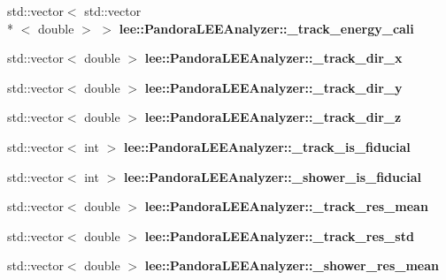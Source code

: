 \begin{DoxyCompactItemize}
\item 
\hypertarget{group__lee_gabc42592a0839c13f76a4eb677328cfb3}{std\-::vector$<$ std\-::vector\\*
$<$ double $>$ $>$ {\bfseries lee\-::\-Pandora\-L\-E\-E\-Analyzer\-::\-\_\-track\-\_\-energy\-\_\-cali}}\label{group__lee_gabc42592a0839c13f76a4eb677328cfb3}

\item 
\hypertarget{group__lee_ga8a992d49401db441d8c6e890ce1c1bce}{std\-::vector$<$ double $>$ {\bfseries lee\-::\-Pandora\-L\-E\-E\-Analyzer\-::\-\_\-track\-\_\-dir\-\_\-x}}\label{group__lee_ga8a992d49401db441d8c6e890ce1c1bce}

\item 
\hypertarget{group__lee_ga28bd177e5a7cacbd35fb5aec0865cd57}{std\-::vector$<$ double $>$ {\bfseries lee\-::\-Pandora\-L\-E\-E\-Analyzer\-::\-\_\-track\-\_\-dir\-\_\-y}}\label{group__lee_ga28bd177e5a7cacbd35fb5aec0865cd57}

\item 
\hypertarget{group__lee_ga2349ca54f697314697ff75504bbf042e}{std\-::vector$<$ double $>$ {\bfseries lee\-::\-Pandora\-L\-E\-E\-Analyzer\-::\-\_\-track\-\_\-dir\-\_\-z}}\label{group__lee_ga2349ca54f697314697ff75504bbf042e}

\item 
\hypertarget{group__lee_ga0c6ecffb2e944bd9842a1bbc1f6a05f1}{std\-::vector$<$ int $>$ {\bfseries lee\-::\-Pandora\-L\-E\-E\-Analyzer\-::\-\_\-track\-\_\-is\-\_\-fiducial}}\label{group__lee_ga0c6ecffb2e944bd9842a1bbc1f6a05f1}

\item 
\hypertarget{group__lee_ga97495f8c6c496aefe56f07f06a5a55ce}{std\-::vector$<$ int $>$ {\bfseries lee\-::\-Pandora\-L\-E\-E\-Analyzer\-::\-\_\-shower\-\_\-is\-\_\-fiducial}}\label{group__lee_ga97495f8c6c496aefe56f07f06a5a55ce}

\item 
\hypertarget{group__lee_gac8415acd9fe624379b1af65fe523a613}{std\-::vector$<$ double $>$ {\bfseries lee\-::\-Pandora\-L\-E\-E\-Analyzer\-::\-\_\-track\-\_\-res\-\_\-mean}}\label{group__lee_gac8415acd9fe624379b1af65fe523a613}

\item 
\hypertarget{group__lee_gacb00c39c2b71bd7fac4a3c7c6733d514}{std\-::vector$<$ double $>$ {\bfseries lee\-::\-Pandora\-L\-E\-E\-Analyzer\-::\-\_\-track\-\_\-res\-\_\-std}}\label{group__lee_gacb00c39c2b71bd7fac4a3c7c6733d514}

\item 
\hypertarget{group__lee_ga9992152dfa9af10448ef0751007d0c3a}{std\-::vector$<$ double $>$ {\bfseries lee\-::\-Pandora\-L\-E\-E\-Analyzer\-::\-\_\-shower\-\_\-res\-\_\-mean}}\label{group__lee_ga9992152dfa9af10448ef0751007d0c3a}


\end{DoxyCompactItemize}
